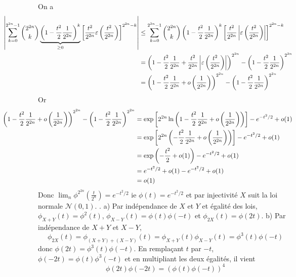\documentclass{report}
\begin{document}
On a $$\hspace{-2cm} \begin{aligned} \left| \sum_{k=0}^{2^{2n}-1} \binom{2^{2n}}{k} \underbrace{\left(  1-\frac{t^2}{2}\frac{1}{2^{2n}}\right)^k}_{\geq 0} \left[\frac{t^2}{2^{2n}}\varepsilon\left(\frac{t^2}{2^{2n}} \right) \right]^{2^{2n}-k} \right| &\leq \sum_{k=0}^{2^{2n}-1} \binom{2^{2n}}{k} \left(  1-\frac{t^2}{2}\frac{1}{2^{2n}}\right)^k \left[\frac{t^2}{2^{2n}}\left|\varepsilon\left(\frac{t^2}{2^{2n}} \right)\right| \right]^{2^{2n}-k}\\
&= \left(1-\frac{t^2}{2}\frac{1}{2^{2n}}+\frac{t^2}{2^{2n}}\left|\varepsilon\left(\frac{t^2}{2^{2n}} \right)\right| \right)^{2^{2n}}-\left( 1-\frac{t^2}{2}\frac{1}{2^{2n}}\right)^{2^{2n}} \\
&= \left(1-\frac{t^2}{2}\frac{1}{2^{2n}}+o\left(\frac{1}{2^{2n}} \right) \right)^{2^{2n}}-\left( 1-\frac{t^2}{2}\frac{1}{2^{2n}}\right)^{2^{2n}} \\
\end{aligned}$$
Or $$\hspace{-2cm} \begin{aligned}
\left(1-\frac{t^2}{2}\frac{1}{2^{2n}}+o\left(\frac{1}{2^{2n}} \right) \right)^{2^{2n}}-\left( 1-\frac{t^2}{2}\frac{1}{2^{2n}}\right)^{2^{2n}} 
&=\exp\left[2^{2n}\ln\left( 1-\frac{t^2}{2}\frac{1}{2^{2n}}+o\left(\frac{1}{2^{2n}}\right)\right)\right] -e^{-t^2/2} + o(1) \\
&= \exp\left[2^{2n}\left( -\frac{t^2}{2}\frac{1}{2^{2n}}+o\left(\frac{1}{2^{2n}}\right)\right)\right] -e^{-t^2/2} + o(1) \\
&= \exp\left( -\frac{t^2}{2} + o(1)\right)-e^{-t^2/2} + o(1) \\
&= e^{-t^2/2} + o(1)-e^{-t^2/2} + o(1) \\
&= o(1)
\end{aligned}$$
Donc $\displaystyle \lim_n \phi^{2^{2n}}(\frac{t}{2^{n}}) = e^{-t^2/2}$ ie $\phi(t)= e^{-t^2/2}$ et par injectivité $X$ suit la loi normale $\mathcal N(0,1)$.\newline
{}. a) Par indépendance de $X$ et $Y$ et égalité des lois, $\phi_{X+Y}(t)=\phi^2(t)$, $\phi_{X-Y}(t)=\phi(t) \phi(-t)$ et $\phi_{2X}(t)=\phi(2t)$.\newline
\newline
b) Par indépendance de $X+Y$ et $X-Y$, $$\phi_{2X}(t)=\phi_{(X+Y)+(X-Y)}(t)=\phi_{X+Y}(t)\phi_{X-Y}(t)=\phi^3(t)\phi(-t)$$ donc $\phi(2t)=\phi^3(t)\phi(-t)$. En remplaçant $t$ par $-t$, $\phi(-2t)=\phi(t)\phi^3(-t)$ et en multipliant les deux égalités, il vient $$\phi(2t)\phi(-2t)=(\phi(t)\phi(-t))^4$$
\end{document}
